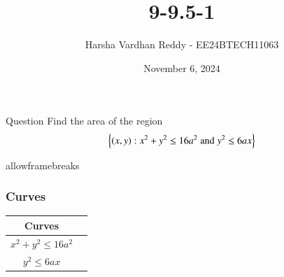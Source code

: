 \documentclass{beamer}
\title %
{9-9.5-1}
\date{November 6, 2024}
\author %
{Harsha Vardhan Reddy - EE24BTECH11063}
\begin{document}
\frame{\titlepage}
\begin{frame}{Question}
Find the area of the region\\
\begin{align*}
    \left\{\left(x,y\right):x^2+y^2\le 16a^2\;\text{and}\;y^2\le6ax\right\}
\end{align*}

\end{frame}
\begin{frame}{allowframebreaks}
\frametitle{Curves}

    \centering
    
    \label{tab:parameters}
	\begin{tabular}[12pt]{ |c| c|}
    \hline
    \textbf{Curves}\\ 
    \hline
     $x^2+y^2\le16a^2$ \\
    \hline 
     $y^2\le6ax$\\
    \hline
    \end{tabular}
\end{frame}
\end{document}
